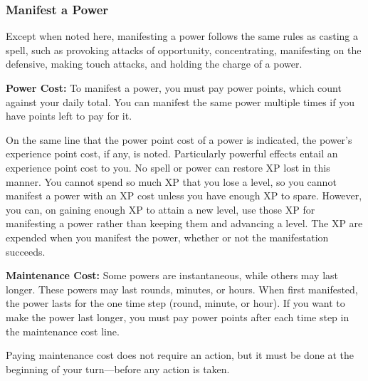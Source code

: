\subsubsection{Manifest a Power}
Except when noted here, manifesting a power follows the same rules as casting a spell, such as provoking attacks of opportunity, concentrating, manifesting on the defensive, making touch attacks, and holding the charge of a power.

\textbf{Power Cost:} To manifest a power, you must pay power points, which count against your daily total. You can manifest the same power multiple times if you have points left to pay for it.


On the same line that the power point cost of a power is indicated, the power's experience point cost, if any, is noted. Particularly powerful effects entail an experience point cost to you. No spell or power can restore XP lost in this manner. You cannot spend so much XP that you lose a level, so you cannot manifest a power with an XP cost unless you have enough XP to spare. However, you can, on gaining enough XP to attain a new level, use those XP for manifesting a power rather than keeping them and advancing a level. The XP are expended when you manifest the power, whether or not the manifestation succeeds.

\textbf{Maintenance Cost:} Some powers are instantaneous, while others may last longer. These powers may last rounds, minutes, or hours. When first manifested, the power lasts for the one time step (round, minute, or hour). If you want to make the power last longer, you must pay power points after each time step in the maintenance cost line.

Paying maintenance cost does not require an action, but it must be done at the beginning of your turn---before any action is taken.

